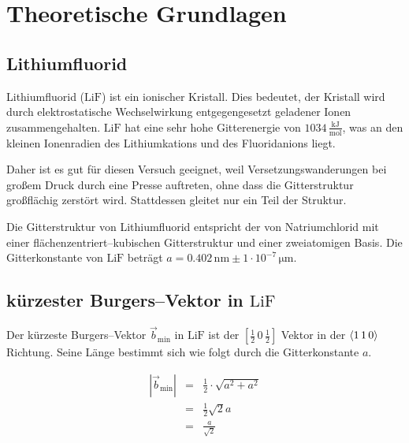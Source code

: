 \documentclass[12pt,a4paper]{scrartcl}
\numberwithin{equation}{section} %
\begin{document}
\clearpage
\hypertarget{theoretische-grundlagen}{%
\section{Theoretische Grundlagen}\label{theoretische-grundlagen}}

\hypertarget{lithiumfluorid}{%
	\subsection{Lithiumfluorid}\label{lithiumfluorid}}

Lithiumfluorid ($\mathrm{LiF}$) ist ein ionischer Kristall. Dies bedeutet, der Kristall wird durch elektrostatische Wechselwirkung entgegengesetzt geladener Ionen zusammengehalten. $\mathrm{LiF}$ hat eine sehr hohe Gitterenergie von $1034\mathrm{\,\frac{kJ}{mol}}$, was an den kleinen Ionenradien des Lithiumkations und des Fluoridanions liegt.

Daher ist es gut für diesen Versuch geeignet, weil Versetzungswanderungen bei großem Druck durch eine Presse auftreten, ohne dass die Gitterstruktur großflächig zerstört wird. Stattdessen gleitet nur ein Teil der Struktur.

Die Gitterstruktur von Lithiumfluorid entspricht der von Natriumchlorid mit einer flächenzentriert--kubischen Gitterstruktur und einer zweiatomigen Basis. Die Gitterkonstante von $\mathrm{LiF}$ beträgt $a=0.402\mathrm{\,nm}\pm 1 \cdot 10^{-7} \mathrm{\, \mu m}$. \cite{Uni}

\hypertarget{kuxfcrzester-burgers-vektor-in-mathrmlif}{%
\subsection{\texorpdfstring{kürzester Burgers--Vektor in
$\mathrm{LiF}$}{kürzester Burgers-Vektor in \textbackslash mathrm\{LiF\}}}\label{kuxfcrzester-burgers-vektor-in-mathrmlif}}

Der kürzeste Burgers--Vektor $\vec{b}_\mathrm{min}$ in $\mathrm{LiF}$ ist der $[\frac{1}{2}\,0\,\frac{1}{2}]$ Vektor in der $\expval{1\,1\,0}$ Richtung. Seine Länge bestimmt sich wie folgt durch die Gitterkonstante $a$. \cite{Uni}

\begin{eqnarray}
    \left|\vec{b}_\mathrm{min}\right|
        &=& \frac{1}{2} \cdot \sqrt{a^2 + a^2} \\
        &=& \frac{1}{2} \sqrt{2} a \\
        &=& \frac{a}{\sqrt{2}}
\end{eqnarray}
\end{document}
